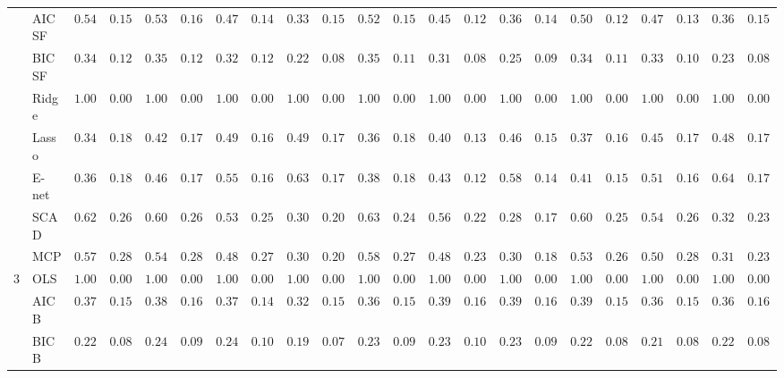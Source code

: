 \begin{tabular}{ll|ll|llllll|llllll|llllll}
 & AIC SF  & $0.5433$ & $0.1582$ & $0.5317$ & $0.1619$ & $0.4783$ & $0.1492$ & $0.3367$ & $0.1553$ & $0.5233$ & $0.1517$ & $0.4567$ & $0.1267$ & $0.3683$ & $0.1466$ & $0.5000$ & $0.1276$ & $0.4767$ & $0.1319$ & $0.3633$ & $0.1542$ \\
 & BIC SF  & $0.3400$ & $0.1296$ & $0.3567$ & $0.1208$ & $0.3250$ & $0.1284$ & $0.2200$ & $0.0850$ & $0.3550$ & $0.1176$ & $0.3167$ & $0.0870$ & $0.2517$ & $0.0902$ & $0.3483$ & $0.1187$ & $0.3300$ & $0.1085$ & $0.2333$ & $0.0886$ \\
 & Ridge  & $1.0000$ & $0.0000$ & $1.0000$ & $0.0000$ & $1.0000$ & $0.0000$ & $1.0000$ & $0.0000$ & $1.0000$ & $0.0000$ & $1.0000$ & $0.0000$ & $1.0000$ & $0.0000$ & $1.0000$ & $0.0000$ & $1.0000$ & $0.0000$ & $1.0000$ & $0.0000$ \\
 & Lasso  & $0.3467$ & $0.1875$ & $0.4250$ & $0.1714$ & $0.4967$ & $0.1606$ & $0.4933$ & $0.1707$ & $0.3667$ & $0.1835$ & $0.4033$ & $0.1323$ & $0.4633$ & $0.1564$ & $0.3767$ & $0.1617$ & $0.4583$ & $0.1747$ & $0.4833$ & $0.1796$ \\
 & E-net  & $0.3600$ & $0.1891$ & $0.4600$ & $0.1710$ & $0.5550$ & $0.1608$ & $0.6350$ & $0.1784$ & $0.3867$ & $0.1802$ & $0.4383$ & $0.1290$ & $0.5867$ & $0.1469$ & $0.4150$ & $0.1598$ & $0.5183$ & $0.1673$ & $0.6417$ & $0.1747$ \\
 & SCAD  & $0.6250$ & $0.2610$ & $0.6017$ & $0.2679$ & $0.5350$ & $0.2555$ & $0.3083$ & $0.2070$ & $0.6383$ & $0.2474$ & $0.5667$ & $0.2235$ & $0.2833$ & $0.1749$ & $0.6017$ & $0.2528$ & $0.5417$ & $0.2663$ & $0.3283$ & $0.2339$ \\
 & MCP  & $0.5750$ & $0.2837$ & $0.5417$ & $0.2876$ & $0.4883$ & $0.2735$ & $0.3000$ & $0.2038$ & $0.5850$ & $0.2727$ & $0.4833$ & $0.2398$ & $0.3033$ & $0.1841$ & $0.5300$ & $0.2695$ & $0.5050$ & $0.2847$ & $0.3150$ & $0.2308$ \\\hline
3 & OLS  & $1.0000$ & $0.0000$ & $1.0000$ & $0.0000$ & $1.0000$ & $0.0000$ & $1.0000$ & $0.0000$ & $1.0000$ & $0.0000$ & $1.0000$ & $0.0000$ & $1.0000$ & $0.0000$ & $1.0000$ & $0.0000$ & $1.0000$ & $0.0000$ & $1.0000$ & $0.0000$ \\
 & AIC B  & $0.3733$ & $0.1573$ & $0.3850$ & $0.1636$ & $0.3767$ & $0.1491$ & $0.3200$ & $0.1548$ & $0.3667$ & $0.1535$ & $0.3900$ & $0.1645$ & $0.3967$ & $0.1688$ & $0.3933$ & $0.1508$ & $0.3683$ & $0.1559$ & $0.3683$ & $0.1646$ \\
 & BIC B  & $0.2250$ & $0.0898$ & $0.2400$ & $0.0927$ & $0.2400$ & $0.1041$ & $0.1967$ & $0.0763$ & $0.2383$ & $0.0984$ & $0.2383$ & $0.1012$ & $0.2317$ & $0.0974$ & $0.2283$ & $0.0875$ & $0.2133$ & $0.0857$ & $0.2250$ & $0.0866$ \\

\end{tabular}
